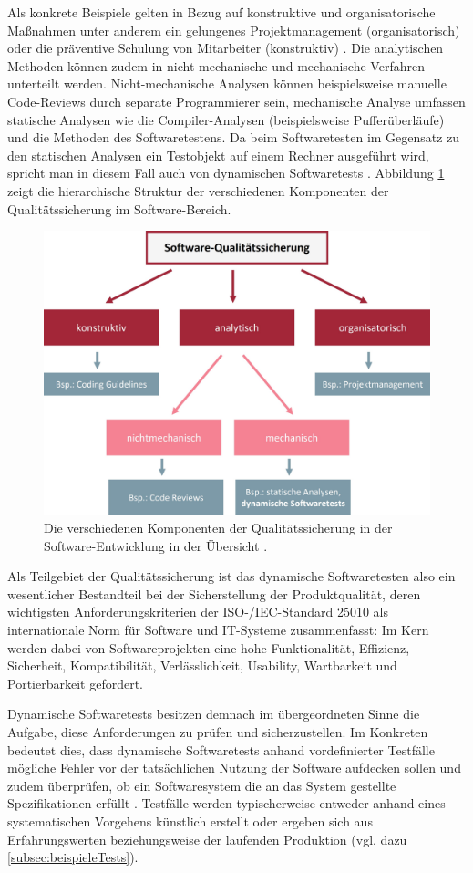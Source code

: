 Als konkrete Beispiele gelten in Bezug auf konstruktive und organisatorische Maßnahmen unter anderem ein gelungenes Projektmanagement (organisatorisch) oder die präventive Schulung von Mitarbeiter (konstruktiv) \cite[S. 272]{ludewig2010software}. Die analytischen Methoden können zudem in nicht-mechanische und mechanische Verfahren unterteilt werden. Nicht-mechanische Analysen können beispielsweise manuelle Code-Reviews durch separate Programmierer sein, mechanische Analyse umfassen statische Analysen wie die Compiler-Analysen (beispielsweise Pufferüberläufe) und die Methoden des Softwaretestens. Da beim Softwaretesten im Gegensatz zu den statischen Analysen ein Testobjekt auf einem Rechner ausgeführt wird, spricht man in diesem Fall auch von dynamischen Softwaretests \cite[S. 135]{spillner2010basiswissen}. Abbildung \ref{fig:qualitaetssicherung} zeigt die hierarchische Struktur der verschiedenen Komponenten der Qualitätssicherung im Software-Bereich.

\begin{figure}[!h]
\centering
\includegraphics[width=0.5\columnwidth]{images/Qualitaetssicherung_Uebersicht.jpg}
\caption{Die verschiedenen Komponenten der Qualitätssicherung in der Software-Entwicklung in der Übersicht \cite[S. 271]{ludewig2010software}.}
\label{fig:qualitaetssicherung}
\end{figure}


Als Teilgebiet der Qualitätssicherung ist das dynamische Softwaretesten also ein wesentlicher Bestandteil bei der Sicherstellung der Produktqualität, deren wichtigsten Anforderungskriterien der ISO-/IEC-Standard 25010 \cite{ISO25010} als internationale Norm für Software und IT-Systeme zusammenfasst: Im Kern werden dabei von Softwareprojekten eine hohe Funktionalität, Effizienz, Sicherheit, Kompatibilität, Verlässlichkeit, Usability, Wartbarkeit und Portierbarkeit gefordert.

Dynamische Softwaretests besitzen demnach im übergeordneten Sinne die Aufgabe, diese Anforderungen zu prüfen und sicherzustellen. Im Konkreten bedeutet dies, dass dynamische Softwaretests anhand vordefinierter Testfälle mögliche Fehler vor der tatsächlichen Nutzung der Software aufdecken sollen und zudem überprüfen, ob ein Softwaresystem die an das System gestellte Spezifikationen erfüllt \cite[S. 246]{sommerville2012software-engineering}. Testfälle werden typischerweise entweder anhand eines systematischen Vorgehens künstlich erstellt oder ergeben sich aus Erfahrungswerten beziehungsweise der laufenden Produktion (vgl. dazu \autoref{subsec:beispieleTests}).  

